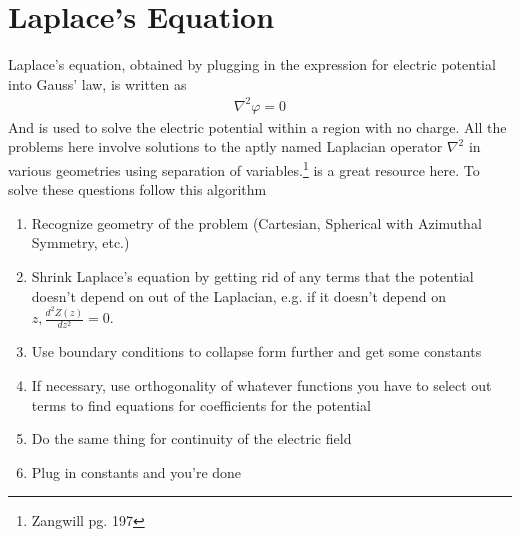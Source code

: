 \section{Laplace's Equation}
Laplace's equation, obtained by plugging in the expression for electric potential into Gauss' law, is written as 
\begin{align}
\nabla^2\varphi = 0
\end{align}
And is used to solve the electric potential within a region with no charge. All the problems here involve solutions to the aptly named Laplacian operator $\nabla^2$ in various geometries using separation of variables.\footnote{Zangwill pg. 197} is a great resource here. To solve these questions follow this algorithm
\begin{enumerate}
\item Recognize geometry of the problem (Cartesian, Spherical with Azimuthal Symmetry, etc.)
\item Shrink Laplace's equation by getting rid of any terms that the potential doesn't depend on out of the Laplacian, e.g. if it doesn't depend on $z, \frac{d^2 Z(z)}{dz^2} = 0$.

\item Use boundary conditions to collapse form further and get some constants

\item If necessary, use orthogonality of whatever functions you have to select out terms to find equations for coefficients for the potential

\item Do the same thing for continuity of the electric field

\item Plug in constants and you're done


\end{enumerate}



